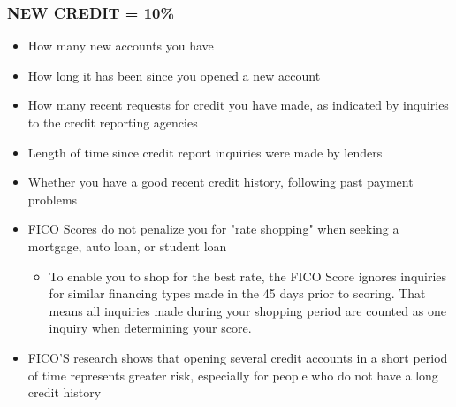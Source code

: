 \documentclass[12pt]{article}
\begin{document}
            \subsubsection{NEW CREDIT = 10\%}
                \begin{itemize}
                    \item How many new accounts you have
                    \item How long it has been since you opened a new account
                    \item How many recent requests for credit you have made, as indicated by inquiries to the credit reporting agencies
                    \item Length of time since credit report inquiries were made by lenders
                    \item Whether you have a good recent credit history, following past payment problems
                    \item FICO Scores do not penalize you for "rate shopping" when seeking a mortgage, auto loan, or student loan
                        \begin{itemize}
                            \item To enable you to shop for the best rate, the FICO Score ignores inquiries for similar financing types made in the
                                45 days prior to scoring. That means all inquiries made during your shopping period are counted as one inquiry when
                                determining your score.
                        \end{itemize}
                    \item FICO'S research shows that opening several credit accounts in a short period of time represents greater risk,
                        especially for people who do not have a long credit history
                \end{itemize}
\end{document}

